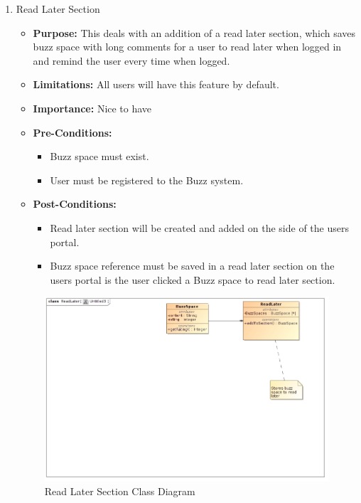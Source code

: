 \documentclass[11pt]{article}
\begin{document}
\begin{enumerate}
\newpage
\item Read Later Section

\begin{itemize}
\item \textbf{Purpose:}
This deals with an addition of a read later section, which saves
buzz space with long comments for a user to read later when logged
in and remind the user every time when logged.
\item\textbf{Limitations:} 
All users will have this feature by default.

\item \textbf{Importance:}  Nice to have
\item\textbf{Pre-Conditions: }
	\begin{itemize}
	\item Buzz space must exist.
	\item User must be registered to the Buzz system.

	\end{itemize}

\item\textbf{Post-Conditions: }
	\begin{itemize}
	\item Read later section will be created and added on the side of the
users portal.
	\item Buzz space reference must be saved in a read later section on the
users portal is the user clicked a Buzz space to read later section.
	
	\end{itemize}
\end{itemize}

\begin{figure}[H]	
\graphicspath{ {../Diagrams/sfiso/} }
    	\includegraphics[scale=0.5,center]{readC.jpg}
    	\caption{Read Later Section Class Diagram}
	\end{figure}


\end{enumerate}
\end{document}
